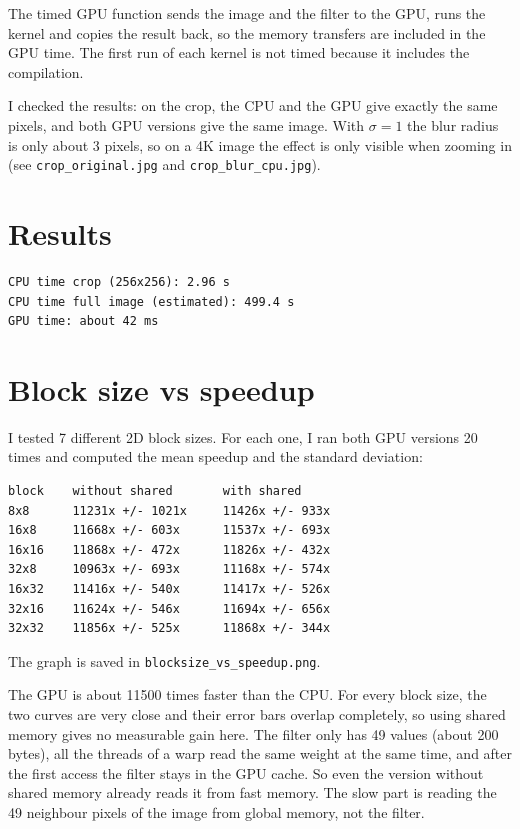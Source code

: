 \documentclass{report}
\begin{document}
The timed GPU function sends the image and the filter to the GPU, runs the kernel and copies the result back, so the memory transfers are included in the GPU time. The first run of each kernel is not timed because it includes the compilation.

I checked the results: on the crop, the CPU and the GPU give exactly the same pixels, and both GPU versions give the same image. With $\sigma = 1$ the blur radius is only about 3 pixels, so on a 4K image the effect is only visible when zooming in (see \texttt{crop\_original.jpg} and \texttt{crop\_blur\_cpu.jpg}).

\section*{Results}

\begin{verbatim}
CPU time crop (256x256): 2.96 s
CPU time full image (estimated): 499.4 s
GPU time: about 42 ms
\end{verbatim}

\section*{Block size vs speedup}

I tested 7 different 2D block sizes. For each one, I ran both GPU versions 20 times and computed the mean speedup and the standard deviation:

\begin{verbatim}
block    without shared       with shared
8x8      11231x +/- 1021x     11426x +/- 933x
16x8     11668x +/- 603x      11537x +/- 693x
16x16    11868x +/- 472x      11826x +/- 432x
32x8     10963x +/- 693x      11168x +/- 574x
16x32    11416x +/- 540x      11417x +/- 526x
32x16    11624x +/- 546x      11694x +/- 656x
32x32    11856x +/- 525x      11868x +/- 344x
\end{verbatim}

The graph is saved in \texttt{blocksize\_vs\_speedup.png}.

The GPU is about 11500 times faster than the CPU. For every block size, the two curves are very close and their error bars overlap completely, so using shared memory gives no measurable gain here. The filter only has 49 values (about 200 bytes), all the threads of a warp read the same weight at the same time, and after the first access the filter stays in the GPU cache. So even the version without shared memory already reads it from fast memory. The slow part is reading the 49 neighbour pixels of the image from global memory, not the filter.
\end{document}
